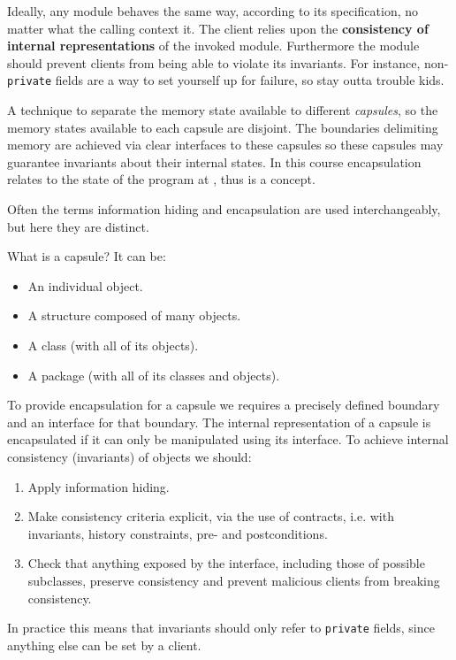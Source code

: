\documentclass{article}
\begin{document}
Ideally, any module behaves the same way, according to its specification, no matter what the calling context it.
The client relies upon the \textbf{consistency of internal representations} of the invoked module.
Furthermore the module should prevent clients from being able to violate its invariants.
For instance, non-\texttt{private} fields are a way to set yourself up for failure, so stay outta trouble kids.

\begin{definition}[Encapsulation]
A technique to separate the memory state available to different \textit{capsules}, so the memory states available to each capsule are disjoint.
The boundaries delimiting memory are achieved via clear interfaces to these capsules so these capsules may guarantee invariants about their internal states.
In this course encapsulation relates to the state of the program at \runtime{}, thus is a \textit{\dynamic{}} concept.
\end{definition}

Often the terms information hiding and encapsulation are used interchangeably, but here they are distinct.

What is a capsule? It can be:
\begin{itemize}
\item An individual object.
\item A structure composed of many objects.
\item A class (with all of its objects).
\item A package (with all of its classes and objects).
\end{itemize}
To provide encapsulation for a capsule we requires a precisely defined boundary and an interface for that boundary.
The internal representation of a capsule is encapsulated if it can only be manipulated using its interface.
To achieve internal consistency (invariants) of objects we should:
\begin{enumerate}
\item Apply information hiding.
\item Make consistency criteria explicit, via the use of contracts, i.e. with invariants, history constraints, pre- and postconditions.
\item Check that anything exposed by the interface, including those of possible subclasses, preserve consistency and prevent malicious clients from breaking consistency.
\end{enumerate}

In practice this means that invariants should only refer to \texttt{private} fields, since anything else can be set by a client.
\end{document}
